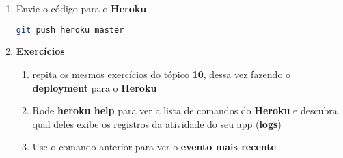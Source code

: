 \documentclass[a4paper,12pt]{article}
\begin{document}
\begin{enumerate}
  \item Envie o código para o \textbf{Heroku}

    \begin{lstlisting}[language=Bash, commentstyle=\color{gray}]
git push heroku master
    \end{lstlisting}

  \item \textbf{Exercícios}

    \begin{enumerate}
      \item repita os mesmos exercícios do tópico \textbf{10}, dessa vez fazendo o \textbf{deployment} para o \textbf{Heroku}
      \item Rode \textbf{heroku help} para ver a lista de comandos do \textbf{Heroku} e descubra qual deles exibe os registros da atividade do seu app (\textbf{logs})
      \item Use o comando anterior para ver o \textbf{evento mais recente}
    \end{enumerate}
\end{enumerate}
\end{document}
